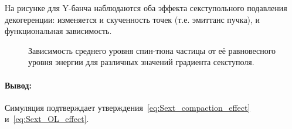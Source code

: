 На рисунке для Y-банча наблюдаются оба эффекта секступольного подавления декогеренции: изменяется и скученность точек (т.е. эмиттанс пучка), и функциональная зависимость.

\begin{figure}[h]
	\centering
	\caption{Зависимость среднего уровня спин-тюна частицы от её равновесного уровня энергии для различных значений градиента секступоля.\label{fig:ST_vs_dkok_for_sext_strenghts}}
\end{figure}

\paragraph{Вывод:} Симуляция подтверждает утверждения~\eqref{eq:Sext_compaction_effect} и~\eqref{eq:Sext_OL_effect}.